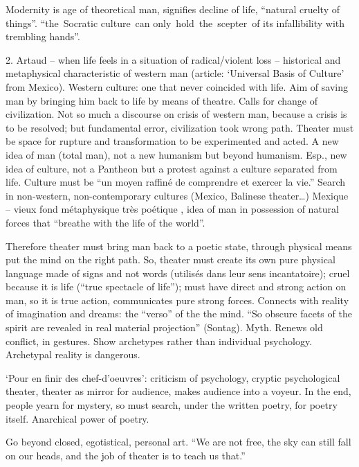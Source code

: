 \documentclass[oneside]{memoir}
\begin{document}
Modernity is age of theoretical man, signifies decline of life,
``natural cruelty of things''. ``the~Socratic culture~can
only~hold~the~scepter~of its infallibility with trembling hands''.

2. Artaud -- when life feels in a situation of radical/violent loss --
historical and metaphysical characteristic of western man (article:
`Universal Basis of Culture' from Mexico). Western culture: one that
never coincided with life. Aim of saving man by bringing him back to
life by means of theatre. Calls for change of civilization. Not so much
a discourse on crisis of western man, because a crisis is to be
resolved; but fundamental error, civilization took wrong path. Theater
must be space for rupture and transformation to be experimented and
acted. A new idea of man (total man), not a new humanism but beyond
humanism. Esp., new idea of culture, not a Pantheon but a protest
against a culture separated from life. Culture must be ``un moyen
raffiné de comprendre et exercer la vie.'' Search in non-western,
non-contemporary cultures (Mexico, Balinese theater\ldots{}) Mexique --
vieux fond métaphysique très poétique , idea of man in possession of
natural forces that ``breathe with the life of the world''.

Therefore theater must bring man back to a poetic state, through
physical means put the mind on the right path. So, theater must create
its own pure physical language made of signs and not words (utilisés
dans leur sens incantatoire); cruel because it is life (``true spectacle
of life''); must have direct and strong action on man, so it is true
action, communicates pure strong forces. Connects with reality of
imagination and dreams: the ``verso'' of the the mind. ``So obscure
facets of the spirit are revealed in real material projection''
(Sontag). Myth. Renews old conflict, in gestures. Show archetypes rather
than individual psychology. Archetypal reality is dangerous.

`Pour en finir des chef-d'oeuvres': criticism of psychology, cryptic
psychological theater, theater as mirror for audience, makes audience
into a voyeur. In the end, people yearn for mystery, so must search,
under the written poetry, for poetry itself. Anarchical power of poetry.

Go beyond closed, egotistical, personal art. ``We are not free, the sky
can still fall on our heads, and the job of theater is to teach us
that.''
\end{document}
